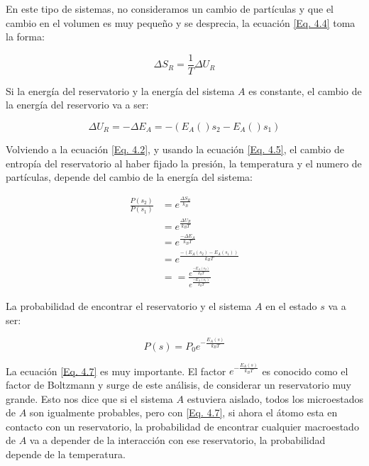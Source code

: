 \documentclass[11pt,fleqn]{book}
\begin{document}
En este tipo de sistemas, no consideramos un cambio de partículas y que el cambio en el volumen es muy pequeño y se desprecia, la ecuación \ref{Eq. 4.4} toma la forma:

\begin{equation}
     \Delta S_{R}=\frac{1}{T}\Delta U_{R}
     \label{Eq. 4.5}
\end{equation}

Si la energía del reservatorio y la energía del sistema $A$ es constante, el cambio de la energía del reservorio va a ser:

\begin{equation*}
    \Delta U_{R}=-\Delta E_{A}=-(E_{A}()s_{2}-E_{A}()s_{1})
\end{equation*}

Volviendo a la ecuación \ref{Eq. 4.2}, y usando la ecuación \ref{Eq. 4.5}, el cambio de entropía del reservatorio al haber fijado la presión, la temperatura y el numero de partículas, depende del cambio de la energía del sistema:
 

\begin{equation}\begin{split}
        \frac{P(s_{2})}{P(s_{1})}&=e^{\frac{\Delta S_{R}}{k_{B}}}\\
        &=e^{\frac{\Delta U_{R}}{k_{B}T}}\\
        &=e^{\frac{-\Delta E_{A}}{k_{B}T}}\\
      &=e^{\frac{-(E_{A}(s_{2})-E_{A}(s_{1}))}{k_{B}T}}\\
      &==\frac{e^{\frac{-E_{A}(s_{2})}{k_{B}T}}}{e^{\frac{-E_{A}(s_{1})}{k_{B}T}}}
\end{split}
    \label{Eq. 4.6}
\end{equation}

La probabilidad de encontrar el reservatorio y el sistema $A$ en el estado $s$ va a ser:

\begin{equation}
       P(s)=P_{0}e^{-\frac{E_{A}(s)}{k_{B}T}}
        \label{Eq. 4.7}
\end{equation}

La ecuación \ref{Eq. 4.7} es muy importante. El factor $e^{-\frac{E_{A}(s)}{k_{B}T}}$ es conocido como el factor de Boltzmann y surge de este análisis, de considerar un reservatorio muy grande. Esto nos dice que si el sistema $A$ estuviera aislado, todos los microestados de $A$ son igualmente probables, pero con \ref{Eq. 4.7}, si ahora el átomo esta en contacto con un reservatorio, la probabilidad de encontrar cualquier macroestado de $A$ va a depender de la interacción con ese reservatorio, la probabilidad depende de la temperatura.
\end{document}
